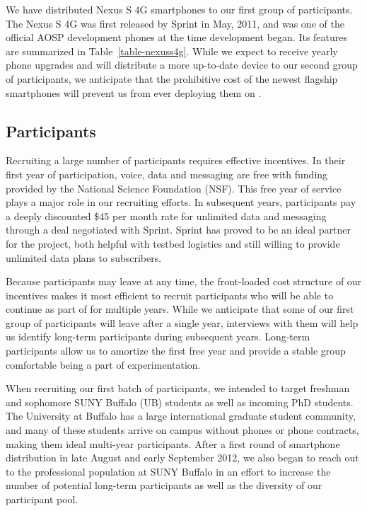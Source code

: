 We have distributed Nexus S 4G smartphones to our first group of
participants. The Nexus S 4G was first released by Sprint in May, 2011, and
was one of the official AOSP development phones at the time \PhoneLab{}
development began. Its features are summarized in Table~\ref{table-nexuss4g}.
While we expect to receive yearly phone upgrades and will distribute a more
up-to-date device to our second group of participants, we anticipate that the
prohibitive cost of the newest flagship smartphones will prevent us from ever
deploying them on \PhoneLab{}.

\subsection{Participants}


Recruiting a large number of \PhoneLab{} participants requires effective
incentives. In their first year of \PhoneLab{} participation, voice, data and
messaging are free with funding provided by the National Science Foundation
(NSF). This free year of service plays a major role in our recruiting
efforts. In subsequent years, participants pay a deeply discounted \$45 per
month rate for unlimited data and messaging through a deal negotiated with
Sprint. Sprint has proved to be an ideal partner for the \PhoneLab{} project,
both helpful with testbed logistics and still willing to provide unlimited
data plans to subscribers.

Because participants may leave at any time, the front-loaded cost structure
of our incentives makes it most efficient to recruit participants who will be
able to continue as part of \PhoneLab{} for multiple years. While we
anticipate that some of our first group of participants will leave after a
single year, interviews with them will help us identify long-term
participants during subsequent years. Long-term participants allow us to
amortize the first free year and provide a stable group comfortable being a
part of \PhoneLab{} experimentation.

When recruiting our first batch of participants, we intended to target freshman
and sophomore SUNY Buffalo (UB) students as well as incoming PhD students. The
University at Buffalo has a large international graduate student community, and
many of these students arrive on campus without phones or phone contracts,
making them ideal multi-year \PhoneLab{} participants. After a first round of
smartphone distribution in late August and early September 2012, we also began
to reach out to the professional population at SUNY Buffalo in an effort to
increase the number of potential long-term participants as well as the diversity
of our participant pool.


